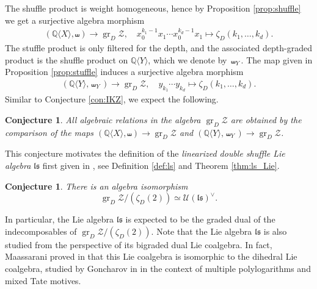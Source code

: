 \documentclass[11pt, a4paper]{amsart}
\newtheorem{conj}[thm]{Conjecture}
\numberwithin{equation}{section}
\theoremstyle{definition}
\newcommand{\Q}{\mathbb{Q}}
\newcommand{\MZV}{\mathcal{Z}}
\newcommand{\grMZV}{\operatorname{gr}_D\MZV}
\newcommand{\QX}{\Q\langle X\rangle}
\newcommand{\QY}{\Q\langle Y\rangle}
\newcommand{\ls}{\mathfrak{ls}}
\begin{document}
The shuffle product is weight homogeneous, hence by Proposition \ref{prop:shuffle} we get a surjective algebra morphism
\begin{align*}
(\QX,\shuffle)\to \grMZV,\quad x_0^{k_1-1}x_1\cdots x_0^{k_d-1}x_1\mapsto\zeta_D(k_1,\ldots,k_d).
\end{align*}
The stuffle product is only filtered for the depth, and the associated depth-graded product is the shuffle product on $\QY$, which we denote by $\shuffle_Y$. The map given in Proposition \ref{prop:stuffle} induces a surjective algebra morphism
\begin{align*}
(\QY,\shuffle_Y)\to \grMZV,\quad y_{k_1}\cdots y_{k_d}\mapsto\zeta_D(k_1,\ldots,k_d).
\end{align*}
Similar to Conjecture \ref{con:IKZ}, we expect the following.
\begin{conj}
All algebraic relations in the algebra $\grMZV$ are obtained by the comparison of the maps $(\QX,\shuffle)\to\grMZV$ and $(\QY,\shuffle_Y)\to\grMZV$.
\end{conj}
This conjecture motivates the definition of the \emph{linearized double shuffle Lie algebra} $\ls$ first given in \cite{Br21}, see Definition \ref{def:ls} and Theorem \ref{thm:ls_Lie}. 
\begin{conj} \label{conj:gr_DZ_and_ls}
There is an algebra isomorphism
\[
\grMZV/(\zeta_D(2))\simeq \mathcal{U}(\ls)^\vee.
\]
\end{conj}
In particular, the Lie algebra $\ls$ is expected to be the graded dual of the indecomposables of $\grMZV/(\zeta_D(2))$. 
Note that the Lie algebra $\ls$ is also studied from the perspective of its bigraded dual Lie coalgebra.
In fact, Maassarani proved in \cite{Mas} that this Lie coalgebra is isomorphic to the dihedral Lie coalgebra, %
studied by Goncharov in \cite{Gon,Gon2} in the context of multiple polylogarithms and mixed Tate motives.

\end{document}
